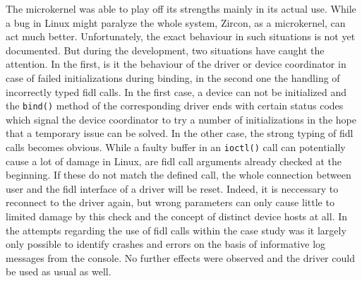 The microkernel was able to play off its strengths mainly in its actual use.
While a bug in Linux might paralyze the whole system, Zircon, as a microkernel, can act much better.
Unfortunately, the exact behaviour in such situations is not yet documented.
But during the development, two situations have caught the attention.
In the first, is it the behaviour of the driver or device coordinator in case of failed initializations during binding, in the second one the handling of incorrectly typed \ac{fidl} calls.
In the first case, a device can not be initialized and the \texttt{bind()} method of the corresponding driver ends with certain status codes which signal the device coordinator to try a number of initializations in the hope that a temporary issue can be solved.
In the other case, the strong typing of \ac{fidl} calls becomes obvious.
While a faulty buffer in an \texttt{ioctl()} call can potentially cause a lot of damage in Linux, are \ac{fidl} call arguments already checked at the beginning.
If these do not match the defined call, the whole connection between user and the \ac{fidl} interface of a driver will be reset.
Indeed, it is neccessary to reconnect to the driver again, but wrong parameters can only cause little to limited damage by this check and the concept of distinct device hosts at all.
In the attempts regarding the use of \ac{fidl} calls within the case study was it largely only possible to identify crashes and errors on the basis of informative log messages from the console.
No further effects were observed and the driver could be used as usual as well.

